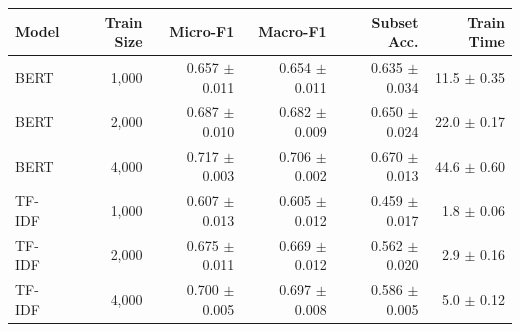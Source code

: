 \begin{tabular}{lrrrrr}
\toprule
Model & Train Size & Micro-F1 & Macro-F1 & Subset Acc. & Train Time \\
\midrule
BERT & 1,000 & 0.657 $\pm$ 0.011 & 0.654 $\pm$ 0.011 & 0.635 $\pm$ 0.034 & 11.5 $\pm$ 0.35 \\
BERT & 2,000 & 0.687 $\pm$ 0.010 & 0.682 $\pm$ 0.009 & 0.650 $\pm$ 0.024 & 22.0 $\pm$ 0.17 \\
BERT & 4,000 & 0.717 $\pm$ 0.003 & 0.706 $\pm$ 0.002 & 0.670 $\pm$ 0.013 & 44.6 $\pm$ 0.60 \\
TF-IDF & 1,000 & 0.607 $\pm$ 0.013 & 0.605 $\pm$ 0.012 & 0.459 $\pm$ 0.017 & 1.8 $\pm$ 0.06 \\
TF-IDF & 2,000 & 0.675 $\pm$ 0.011 & 0.669 $\pm$ 0.012 & 0.562 $\pm$ 0.020 & 2.9 $\pm$ 0.16 \\
TF-IDF & 4,000 & 0.700 $\pm$ 0.005 & 0.697 $\pm$ 0.008 & 0.586 $\pm$ 0.005 & 5.0 $\pm$ 0.12 \\
\bottomrule
\end{tabular}
